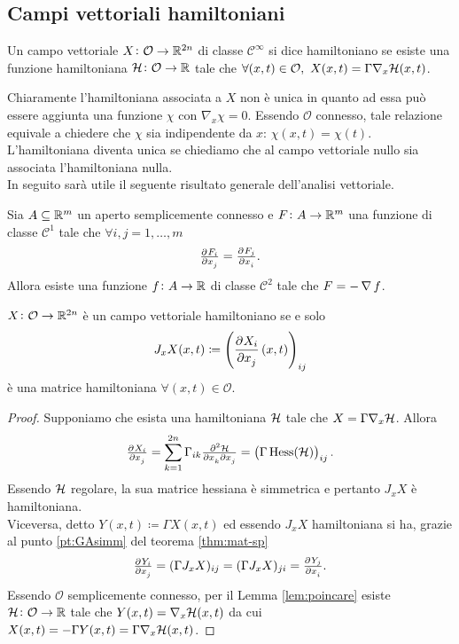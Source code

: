 \subsection{Campi vettoriali hamiltoniani}

\begin{definition}
    Un campo vettoriale $ X \colon \mathcal{O} \to \mathbb{R}^{2n} $ di classe $ \mathcal{C}^\infty $ si dice hamiltoniano se esiste una funzione hamiltoniana $ \mathcal{H} \colon \mathcal{O} \to \mathbb{R} $ tale che $ \forall (x, t) \in \mathcal{O}, \ X(x, t) = \Gamma \nabla_x \mathcal{H}(x, t) $.
\end{definition}

Chiaramente l'hamiltoniana associata a $ X $ non è unica in quanto ad essa può essere aggiunta una funzione $ \chi $ con $ \nabla_x \chi = 0 $. Essendo $ \mathcal{O} $ connesso, tale relazione equivale a chiedere che $ \chi $ sia indipendente da $ x $: $ \chi(x, t) = \chi(t) $. L'hamiltoniana diventa unica se chiediamo che al campo vettoriale nullo sia associata l'hamiltoniana nulla. \\

In seguito sarà utile il seguente risultato generale dell'analisi vettoriale.

\begin{lemma}[Poincaré] \label{lem:poincare}
    Sia $ A \subseteq \mathbb{R}^m $ un aperto semplicemente connesso e $ F \colon A \to \mathbb{R}^m $ una funzione di classe $ \mathcal{C}^1 $ tale che $ \forall i, j = 1, \ldots, m $
    \[
        \pd{F_i}{x_j} = \pd{F_j}{x_i}.
    \]
    Allora esiste una funzione $ f \colon A \to \mathbb{R} $ di classe $ \mathcal{C}^2 $ tale che $ F = - \operatorname{\nabla}{f} $.
\end{lemma}

\begin{thm} \label{thm:campo-hamiltoniano}
    $ X \colon \mathcal{O} \to \mathbb{R}^{2n} $ è un campo vettoriale hamiltoniano se e solo
    \begin{equation}
        J_x X (x, t) \coloneqq \left(\dpd{X_i}{x_j}(x, t)\right)_{ij}
    \end{equation}
    è una matrice hamiltoniana $ \forall (x, t) \in \mathcal{O} $.
\end{thm}
\begin{proof}
    Supponiamo che esista una hamiltoniana $ \mathcal{H} $ tale che $ X = \Gamma \nabla_x \mathcal{H} $. Allora
    \[
        \pd{X_i}{x_j} = \sum_{k=1}^{2n} \Gamma_{ik} \md{\ham}{2}{x_k}{}{x_j}{} = \left( \Gamma \, \mathrm{Hess}(\ham) \right)_{ij}.
    \]
    Essendo $ \mathcal{H} $ regolare, la sua matrice hessiana è simmetrica e pertanto $ J_x X $ è hamiltoniana. \\
    Viceversa, detto $ Y(x, t) \coloneqq \Gamma X(x, t) $ ed essendo $ J_x X $ hamiltoniana si ha, grazie al punto \ref{pt:GAsimm} del teorema \ref{thm:mat-sp}
    \[
        \pd{Y_i}{x_j} = (\Gamma J_x X)_{ij} = (\Gamma J_x X)_{ji} = \pd{Y_j}{x_i}.
    \]
    Essendo $ \mathcal{O} $ semplicemente connesso, per il Lemma \ref{lem:poincare} esiste $ \mathcal{H} \colon \mathcal{O} \to \mathbb{R} $ tale che $ Y(x, t) = \nabla_x \mathcal{H}(x, t) $ da cui $ X(x, t) = -\Gamma Y(x, t) = \Gamma \nabla_x \mathcal{H}(x, t) $.
\end{proof}

